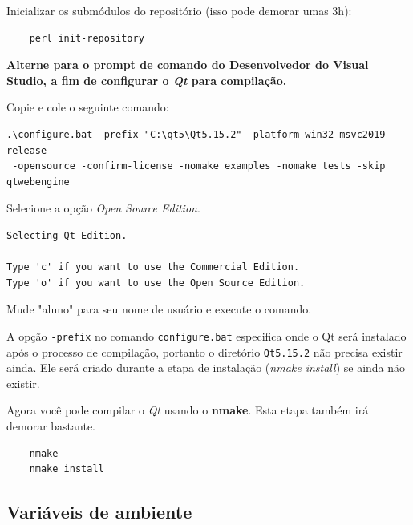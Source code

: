\documentclass[a4paper,11pt]{article}
\newcommand{\qt}{\textit{Qt}}
\newcommand{\cautionbox}[1]{
	\vskip 5mm
	\begin{leftbar}
		\textbf{#1}
	\end{leftbar}
	\vskip 5mm
}
\begin{document}
Inicializar os submódulos do repositório (isso pode demorar umas 3h):
\begin{mdframed}
\begin{verbatim}
	perl init-repository
\end{verbatim}
\end{mdframed}

\cautionbox{
Alterne para o prompt de comando do Desenvolvedor do Visual Studio, a fim de configurar o \qt{} para compilação.
}

Copie e cole o seguinte comando:

\small
\begin{mdframed}
\begin{verbatim}
.\configure.bat -prefix "C:\qt5\Qt5.15.2" -platform win32-msvc2019 release
 -opensource -confirm-license -nomake examples -nomake tests -skip qtwebengine
\end{verbatim}
\end{mdframed}
\normalsize

Selecione a opção \textit{Open Source Edition}.
\begin{mdframed}
\begin{verbatim}
Selecting Qt Edition.

Type 'c' if you want to use the Commercial Edition.
Type 'o' if you want to use the Open Source Edition.
\end{verbatim}
\end{mdframed}

Mude "aluno" para seu nome de usuário e execute o comando.

A opção {\tt -prefix} no comando {\tt configure.bat} especifica onde o Qt será instalado após o processo de compilação, portanto o diretório {\tt Qt5.15.2} não precisa existir ainda. Ele será criado durante a etapa de instalação (\textit{nmake install}) se ainda não existir.

Agora você pode compilar o \qt{} usando o \textbf{nmake}.
Esta etapa também irá demorar bastante.

\begin{mdframed}
\begin{verbatim}	
	nmake
	nmake install
\end{verbatim}
\end{mdframed}


\subsection{Variáveis de ambiente}
\end{document}
